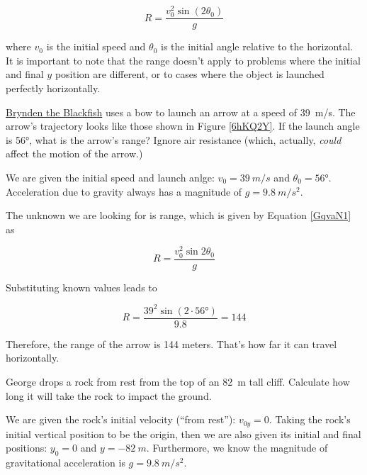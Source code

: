 \documentclass[main.tex]{subfiles}
\begin{document}
\begin{equation} \label{GqvaN1}
    R = \frac{v_0^2 \sin{(2\theta_0)}}{g}
\end{equation}

where $v_0$ is the initial speed and $\theta_0$ is the initial angle relative to the horizontal. It is important to note that the range doesn't apply to problems where the initial and final $y$ position are different, or to cases where the object is launched perfectly horizontally.

\begin{example}
    \href{https://youtu.be/9Ijev8RHF04}{Brynden the Blackfish} uses a bow to launch an arrow at a speed of \SI{39}{m/s}. The arrow's trajectory looks like those shown in Figure \ref{6hKQ2Y}. If the launch angle is \ang{56}, what is the arrow's range? Ignore air resistance (which, actually, \textit{could} affect the motion of the arrow.) 
\end{example}

\Solution We are given the initial speed and launch anlge: $v_0 = \SI{39}{m/s}$ and $\theta_0 = \ang{56}$. Acceleration due to gravity always has a magnitude of $g = \SI{9.8}{m/s^2}$. 

\vspace{1em}

The unknown we are looking for is range, which is given by Equation \eqref{GqvaN1} as

\begin{equation*}
    R = \frac{v_0^2 \sin{2\theta_0}}{g}
\end{equation*}

Substituting known values leads to

\begin{equation*}
    R = \frac{39^2 \sin{(2 \cdot \ang{56})}}{9.8} = 144
\end{equation*}

Therefore, the range of the arrow is 144 meters. That's how far it can travel horizontally.

\solutionEnd

\begin{example} \label{9XXF9X}
    George drops a rock from rest from the top of an \SI{82}{m} tall cliff. Calculate how long it will take the rock to impact the ground. 
\end{example}

\Solution We are given the rock's initial velocity (``from rest''): $v_{0y} = 0$. Taking the rock's initial vertical position to be the origin, then we are also given its initial and final positions: $y_0 = 0$ and $y = \SI{-82}{m}$. Furthermore, we know the magnitude of gravitational acceleration is $g = \SI{9.8}{m/s^2}$. 
\end{document}
